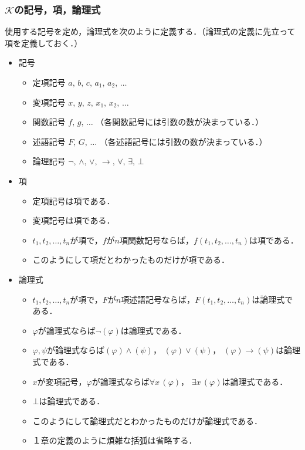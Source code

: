\documentclass[10pt,b5paper,papersize,dvipdfmx]{jsbook}
\newcommand\fal[1]{\forall#1\,}
\newcommand\ext[1]{\exists#1\,}
\begin{document}
\subsubsection{\texorpdfstring{$\mathcal K$}{K}の記号，項，論理式} %
使用する記号を定め，論理式を次のように定義する．（論理式の定義に先立って項を定義しておく．）
\begin{itemize}
  \item 記号
    \begin{itemize}
      \item 定項記号 $a,\, b,\, c,\, a_1,\, a_2,\, \dots$
      \item 変項記号 $x,\, y,\, z,\, x_1,\, x_2,\, \dots$
      \item 関数記号 $f,\, g,\, \dots$ （各関数記号には引数の数が決まっている．）
      \item 述語記号 $F,\, G,\, \dots$ （各述語記号には引数の数が決まっている．）
      \item 論理記号 $\lnot,\, \land,\, \lor,\, \to,\, \forall,\, \exists,\, \bot$
    \end{itemize}
  \item 項
    \begin{itemize}
      \item 定項記号は項である．
      \item 変項記号は項である．
      \item $t_1,t_2,\dots,t_n$が項で，$f$が$n$項関数記号ならば，$f(t_1,t_2,\dots,t_n)$は項である．
      \item このようにして項だとわかったものだけが項である．
    \end{itemize}
  \item 論理式
    \begin{itemize}
      \item $t_1,t_2,\dots,t_n$が項で，$F$が$n$項述語記号ならば，$F(t_1,t_2,\dots,t_n)$は論理式である．
      \item $\varphi$が論理式ならば$\lnot (\varphi)$は論理式である．
      \item $\varphi,\psi$が論理式ならば$(\varphi) \land (\psi)$， $(\varphi) \lor (\psi)$， $(\varphi) \to (\psi)$は論理式である．
      \item $x$が変項記号，$\varphi$が論理式ならば$\fal{x} (\varphi)$， $\ext{x} (\varphi)$は論理式である．
      \item $\bot$は論理式である．
      \item このようにして論理式だとわかったものだけが論理式である．
      \item １章の定義のように煩雑な括弧は省略する．
    \end{itemize}
\end{itemize}
\end{document}
